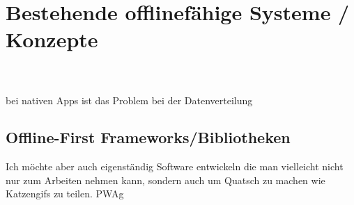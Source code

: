 \chapter{\label{chap:state}Bestehende offlinefähige Systeme / Konzepte}
\\
\\
bei nativen Apps ist das Problem bei der Datenverteilung
%
%
\section{\label{sec:frameworks}Offline-First Frameworks/Bibliotheken}
Ich möchte aber auch eigenständig Software entwickeln die man vielleicht nicht nur zum Arbeiten nehmen kann, sondern auch um Quatsch zu machen wie Katzengifs zu teilen.
\Gls{PWAg}
%
%

%
%


%
%


%
%


%
%

